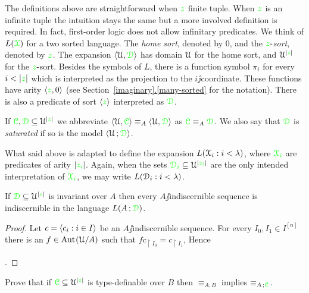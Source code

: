 \documentclass[creche.tex]{subfiles}
\begin{document}
\begin{remark}
The definitions above are straightforward when ${\color{green} z}$ finite tuple. When ${\color{green} z}$ is an infinite tuple the intuition stays the same but a more involved definition is required. In fact, first-order logic does not allow infinitary predicates. We think of $L({\color{green}\EuScript X})$ for a two sorted language. The \textit{home sort}, denoted by $0$, and the ${\color{green} z}\mbox{-}$\textit{sort}, denoted by ${\color{green} z}$. The expansion $\langle\EuScript U,{\color{green}\EuScript D}\rangle$ has domain $\EuScript U$ for the home sort, and $\EuScript U^{|{\color{green} z}|}$ for the ${\color{green} z}\mbox{-}$sort. Besides the symbols of $L$, there is a function symbol $\pi_i$ for every $i<|{\gr z}|$ which is interpreted as the projection to the $i\jj$coordinate. These functions have arity $\langle{\color{green}z},0\rangle$ (see Section~\hyperref[many-sorted]{\ref*{imaginary}.\ref*{many-sorted}} for the notation). There is also a predicate of sort $\langle{\color{green}z}\rangle$ interpreted as ${\color{green}\EuScript D}$.\QED
\end{remark}
If ${\color{green}{\color{green}\EuScript C}},{\color{green}\EuScript D}\subseteq\EuScript U^{|{\color{green} z}|}$ we abbreviate $\langle\EuScript U,{\color{green}{\color{green}\EuScript C}}\rangle\equiv_A\langle\EuScript U,{\color{green}\EuScript D}\rangle$ as ${\color{green}{\color{green}\EuScript C}}\equiv_A{\color{green}\EuScript D}$. We also say that ${\color{green}\EuScript D}$ is \emph{saturated\/} if so is the model $\langle\EuScript U\,;{\color{green}\EuScript D}\rangle$.

What said above is adapted to define the expansion  \emph{$L(\EuScript X_i:i<\lambda)$}, where ${\color{green}\EuScript X_i}$ are predicates of arity $|{\color{green} z_i}|$. Again, when the sets ${\color{green}\EuScript D_i}\subseteq\EuScript U^{|{\color{green} z_i}|}$ are the only intended interpretation of  ${\color{green}\EuScript X_i}$, we may write \emph{$L(\EuScript D_i:i<\lambda)$}.

\begin{proposition}\label{prop_indiscernible_L(A,D)}
If ${\color{green}\EuScript D}\subseteq\EuScript U^{|{\color{green} z}|}$ is invariant over $A$ then every $A\jj$indiscernible sequence is indiscernible in the language $L(A\,;{\color{green}\EuScript D})$.
\end{proposition}

\begin{proof}
Let $c=\langle c_i:i\in I\rangle$ be an $A\jj$indiscernible sequence. For every $I_0,I_1\in I^{[n]}$ there is an $f\in\textrm{Aut\kern.15ex}(\EuScript U/A)$ such that $fc_{\restriction I_0}=c_{\restriction I_1}$, Hence 

.
\end{proof}



\begin{exercise}
Prove that if ${\color{green}{\color{green}\EuScript C}}\subseteq\EuScript U^{|{\color{green} z}|}$ is type-definable over $B$ then $\equiv_{A,B}$ implies $\equiv_{A\,;{\color{green}\EuScript C}}$.\QED
\end{exercise} 
\end{document}
